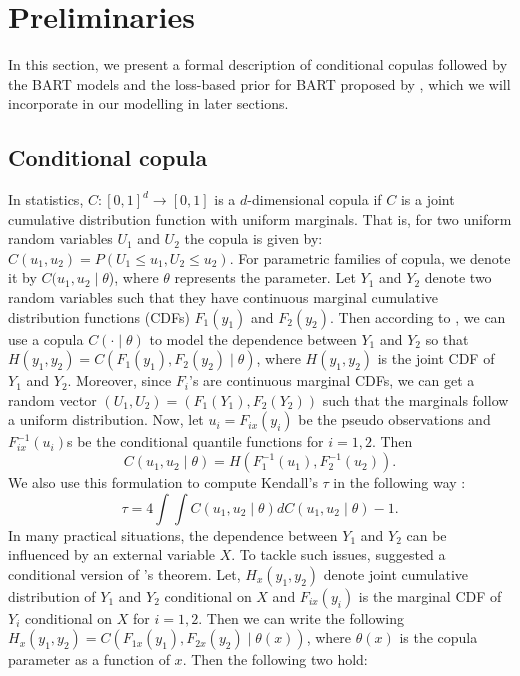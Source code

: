 \documentclass[
12pt]{article}
\begin{document}
	\section{Preliminaries}\label{sec:prelim}
	
	In this section, we present a formal description of conditional copulas followed by the BART models and the loss-based prior for BART proposed by \citet{serafini2024lossbasedpriortreetopologies}, which we will incorporate in our modelling in later sections.
	
	\subsection{Conditional copula}
	In statistics, $C:[0,1]^d\to [0,1]$ is a $d$-dimensional copula if $C$ is a joint cumulative distribution function with uniform marginals. That is, for two uniform random variables $U_1$ and $U_2$ the copula is given by: $C(u_1,u_2) = P(U_1\le u_1, U_2\le u_2)$. For parametric families of copula, we denote it by $C(u_1,u_2\mid \theta$), where $\theta$ represents the parameter. Let $Y_1$ and $Y_2$ denote two random variables such that they have continuous marginal cumulative distribution functions (CDFs) $F_1(y_1)$ and $F_2(y_2)$. Then according to \citet{sklar:1959}, we can use a copula $C(\cdot\mid\theta)$ to model the dependence between $Y_1$ and $Y_2$ so that
	$H(y_1,y_2) = C\left(F_{1}(y_1),F_{2}(y_2)\mid \theta\right)$, where $H(y_1,y_2)$ is the joint CDF of $Y_1$ and $Y_2$. Moreover, since $F_i$'s are continuous marginal CDFs, we can get a random vector $(U_1,U_2)=(F_1(Y_1),F_2(Y_2))$ such that the marginals follow a uniform distribution. Now, let $u_i = F_{ix}(y_i)$ be the pseudo observations and $F_{ix}^{-1}(u_i)$s be the conditional quantile functions for $i=1,2$. Then
	\begin{equation*}
		C\left(u_1,u_2\mid \theta\right) = H\left(F_{1}^{-1}(u_1),F_{2}^{-1}(u_2)\right).
	\end{equation*}
	We also use this formulation to compute Kendall's $\tau$ in the following way \citep{nelsen2006}:
	\begin{equation*}
		\tau = 4\int \int C(u_1,u_2\mid \theta)dC(u_1,u_2 \mid \theta) - 1.
	\end{equation*}
	In many practical situations, the dependence between $Y_1$ and $Y_2$ can be influenced by an external variable $X$. To tackle such issues, \citet{patton2006} suggested a conditional version of \citet{sklar:1959}'s theorem. Let, $H_x(y_1,y_2)$ denote joint cumulative distribution of $Y_1$ and $Y_2$ conditional on $X$ and $F_{ix}(y_i)$ is the marginal CDF of $Y_i$ conditional on $X$ for $i=1,2$. Then we can write the following $H_x(y_1,y_2) = C\left(F_{1x}(y_1),F_{2x}(y_2)\mid \theta(x)\right)$, where $\theta(x)$ is the copula parameter as a function of $x$. Then the following two hold:
\end{document}
